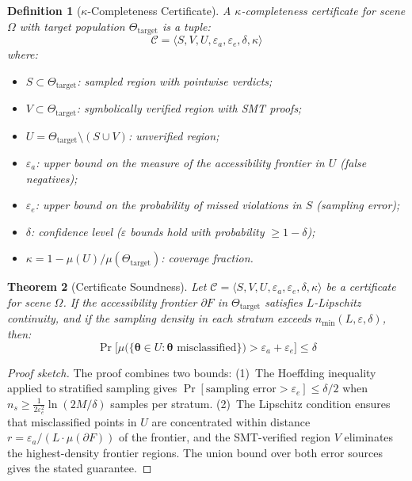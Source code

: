 \documentclass[11pt,letterpaper]{article}
\newtheorem{theorem}{Theorem}[section]
\newtheorem{definition}[theorem]{Definition}
\newcommand{\eps}{\varepsilon}
\newcommand{\cert}{\mathcal{C}}
\newcommand{\scene}{\Omega}
\newcommand{\param}{\Theta}
\newcommand{\bodyp}{\boldsymbol{\theta}}
\begin{document}
\begin{definition}[$\kappa$-Completeness Certificate]
A $\kappa$-completeness certificate for scene $\scene$ with target population $\param_{\mathrm{target}}$ is a tuple:
\begin{equation}
\cert = \langle S, V, U, \eps_a, \eps_e, \delta, \kappa \rangle
\end{equation}
where:
\begin{itemize}[nosep]
  \item $S \subset \param_{\mathrm{target}}$: sampled region with pointwise verdicts;
  \item $V \subset \param_{\mathrm{target}}$: symbolically verified region with SMT proofs;
  \item $U = \param_{\mathrm{target}} \setminus (S \cup V)$: unverified region;
  \item $\eps_a$: upper bound on the measure of the accessibility frontier in $U$ (false negatives);
  \item $\eps_e$: upper bound on the probability of missed violations in $S$ (sampling error);
  \item $\delta$: confidence level ($\eps$ bounds hold with probability $\geq 1 - \delta$);
  \item $\kappa = 1 - \mu(U)/\mu(\param_{\mathrm{target}})$: coverage fraction.
\end{itemize}
\end{definition}

\begin{theorem}[Certificate Soundness]
\label{thm:soundness}
Let $\cert = \langle S, V, U, \eps_a, \eps_e, \delta, \kappa \rangle$ be a certificate for scene $\scene$.
If the accessibility frontier $\partial F$ in $\param_{\mathrm{target}}$ satisfies $L$-Lipschitz continuity, and if the sampling density in each stratum exceeds $n_{\min}(L, \eps, \delta)$, then:
\begin{equation}
\Pr\bigl[\mu\bigl(\{\bodyp \in U : \bodyp \text{ misclassified}\}\bigr) > \eps_a + \eps_e\bigr] \leq \delta
\end{equation}
\end{theorem}

\begin{proof}[Proof sketch]
The proof combines two bounds:
(1)~The Hoeffding inequality~\cite{hoeffding1963} applied to stratified sampling gives $\Pr[\text{sampling error} > \eps_e] \leq \delta/2$ when $n_s \geq \frac{1}{2\eps_e^2} \ln(2M/\delta)$ samples per stratum.
(2)~The Lipschitz condition ensures that misclassified points in $U$ are concentrated within distance $r = \eps_a / (L \cdot \mu(\partial F))$ of the frontier, and the SMT-verified region $V$ eliminates the highest-density frontier regions.
The union bound over both error sources gives the stated guarantee.
\end{proof}
\end{document}
